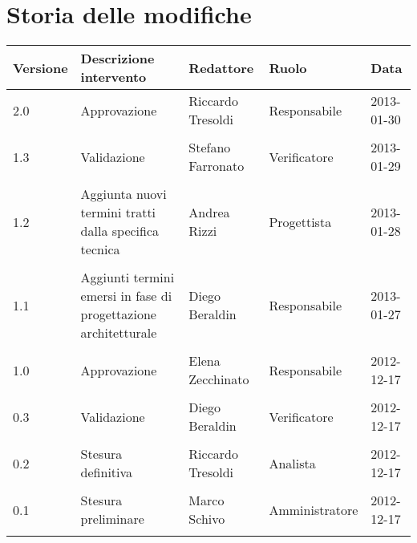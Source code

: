 \section*{Storia delle modifiche}
\begin{longtable}{lp{}lll}
\toprule
Versione & Descrizione intervento & Redattore & Ruolo & Data\\
\midrule %
2.0 & Approvazione & Riccardo Tresoldi & Responsabile & 2013-01-30\\\\
1.3 & Validazione & Stefano Farronato & Verificatore & 2013-01-29\\\\
1.2 & Aggiunta nuovi termini tratti dalla specifica tecnica & Andrea Rizzi & Progettista & 2013-01-28\\\\
1.1 & Aggiunti termini emersi in fase di progettazione architetturale & Diego Beraldin & Responsabile & 2013-01-27\\\\
1.0 & Approvazione & Elena Zecchinato & Responsabile & 2012-12-17\\\\
0.3 & Validazione & Diego Beraldin & Verificatore & 2012-12-17\\\\
0.2 & Stesura definitiva & Riccardo Tresoldi & Analista & 2012-12-17\\\\
0.1 & Stesura preliminare & Marco Schivo & Amministratore & 2012-12-17\\\\
\bottomrule
\end{longtable}
\newpage

\setcounter{page}{1}
\pagestyle{normal}




